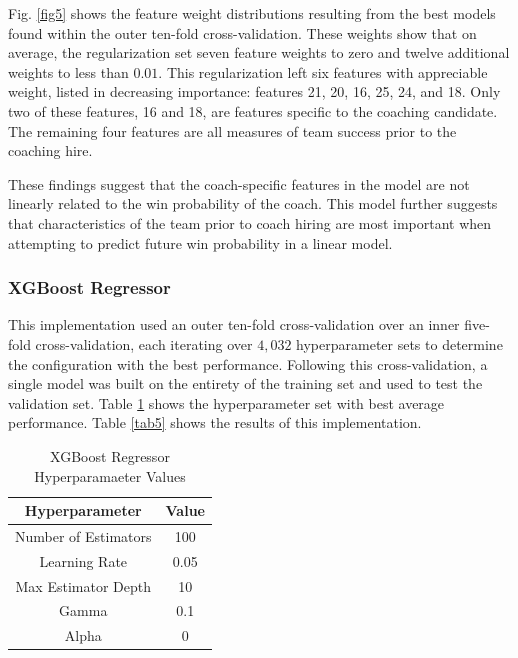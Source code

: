 \documentclass[conference]{IEEEtran}
\begin{document}
Fig. \ref{fig5} shows the feature weight distributions resulting from the best models found within the outer ten-fold cross-validation. These weights show that on average, the regularization set seven feature weights to zero and twelve additional weights to less than $0.01$. This regularization left six features with appreciable weight, listed in decreasing importance: features 21, 20, 16, 25, 24, and 18. Only two of these features, 16 and 18, are features specific to the coaching candidate. The remaining four features are all measures of team success prior to the coaching hire. 

These findings suggest that the coach-specific features in the model are not linearly related to the win probability of the coach. This model further suggests that characteristics of the team prior to coach hiring are most important when attempting to predict future win probability in a linear model.

\subsubsection{XGBoost Regressor}
This implementation used an outer ten-fold cross-validation over an inner five-fold cross-validation, each iterating over $4,032$ hyperparameter sets to determine the configuration with the best performance. Following this cross-validation, a single model was built on the entirety of the training set and used to test the validation set. Table \ref{tab4} shows the hyperparameter set with best average performance. Table \ref{tab5} shows the results of this implementation.

\begin{table}[htbp]
\caption{XGBoost Regressor Hyperparamaeter Values}
\begin{center}
\begin{tabular}{|c||c|}
\hline
\textbf{Hyperparameter} & \textbf{Value} \\
\hline
\hline
Number of Estimators & 100 \\
\hline
Learning Rate & 0.05 \\
\hline
Max Estimator Depth & 10 \\
\hline
Gamma & 0.1 \\
\hline
Alpha & 0 \\
\hline
\end{tabular}
\label{tab4}
\end{center}
\end{table}
\end{document}
